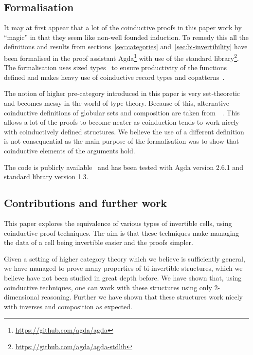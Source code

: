 \documentclass[draft]{article}
\begin{document}
\subsection{Formalisation}\label{sec:formalisation}

It may at first appear that a lot of the coinductive proofs in this
paper work by ``magic'' in that they seem like non-well founded
induction. To remedy this all the definitions and results from
sections~\ref{sec:categories} and~\ref{sec:bi-invertibility} have
been formalised in the proof assistant
Agda\footnote{\url{https://github.com/agda/agda}} with use of the
standard library\footnote{\url{https://github.com/agda/agda-stdlib}}.
The formalisation uses sized types~\cite{Abel_2010} to ensure
productivity of the functions defined and makes heavy use of
coinductive record types and
copatterns~\cite{10.1145/2480359.2429075}.

The notion of higher pre-category introduced in this paper is very
set-theoretic and becomes messy in the world of type theory. Because
of this, alternative coinductive definitions of globular sets and
composition are taken
from~~\cite{hirschowitz_et_al:LIPIcs:2015:5166}.
This allows a lot of the proofs to become neater as coinduction tends
to work nicely with coinductively defined structures. We believe the
use of a different definition is not consequential as the main purpose
of the formalisation was to show that coinductive elements of the
arguments hold.

The code is publicly available~\cite{rice_agda} and has been tested
with Agda version 2.6.1 and standard library version
1.3.

\subsection{Contributions and further work}\label{sec:conclusion}

This paper explores the equivalence of various types of invertible
cells, using coinductive proof techniques. The aim is that these
techniques make managing the data of a cell being invertible easier
and the proofs simpler.

Given a setting of higher category theory which we believe is
sufficiently general, we have managed to prove many properties of
bi-invertible structures, which we believe have not been studied in
great depth before. We have shown that, using coinductive techniques,
one can work with these structures using only 2-dimensional reasoning.
Further we have shown that these structures work nicely with inverses
and composition as expected.
\end{document}
